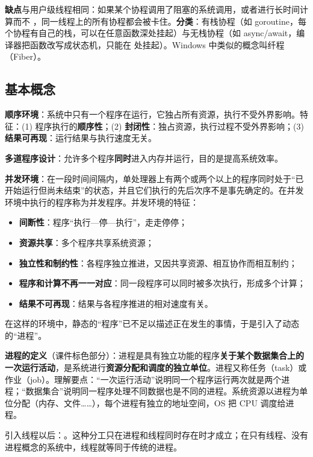 \textbf{缺点}与用户级线程相同：如果某个协程调用了阻塞的系统调用，或者进行长时间计算而不 ，同一线程上的所有协程都会被卡住。\textbf{分类}：有栈协程（如 goroutine，每个协程有自己的栈，可以在任意函数深处挂起）与无栈协程（如 async/await，编译器把函数改写成状态机，只能在  处挂起）。Windows 中类似的概念叫纤程（Fiber）。

\subsection{基本概念}

\textbf{顺序环境}：系统中只有一个程序在运行，它独占所有资源，执行不受外界影响。特征：(1) 程序执行的\textbf{顺序性}；(2) \textbf{封闭性}：独占资源，执行过程不受外界影响；(3) \textbf{结果可再现}：运行结果与执行速度无关。

\textbf{多道程序设计}：允许多个程序\textbf{同时}进入内存并运行，目的是提高系统效率。

\textbf{并发环境}：在一段时间间隔内，单处理器上有两个或两个以上的程序同时处于“已开始运行但尚未结束”的状态，并且它们执行的先后次序不是事先确定的。在并发环境中执行的程序称为并发程序。并发环境的特征：
\begin{itemize}
    \item \textbf{间断性}：程序“执行—停—执行”，走走停停；
    \item \textbf{资源共享}：多个程序共享系统资源；
    \item \textbf{独立性和制约性}：各程序独立推进，又因共享资源、相互协作而相互制约；
    \item \textbf{程序和计算不再一一对应}：同一段程序可以同时被多次执行，形成多个计算；
    \item \textbf{结果不可再现}：结果与各程序推进的相对速度有关。
\end{itemize}
在这样的环境中，静态的“程序”已不足以描述正在发生的事情，于是引入了动态的“进程”。

\textbf{进程的定义}（课件标色部分）：进程是具有独立功能的程序\textbf{关于某个数据集合上的一次运行活动}，是系统进行\textbf{资源分配和调度的独立单位}。进程又称任务（task）或作业（job）。理解要点：“一次运行活动”说明同一个程序运行两次就是两个进程；“数据集合”说明同一程序处理不同数据也是不同的进程。系统资源以进程为单位分配（内存、文件……），每个进程有独立的地址空间，OS 把 CPU 调度给进程。

\ez 引入线程以后：。这种分工只在进程和线程同时存在时才成立；在只有线程、没有进程概念的系统中，线程就等同于传统的进程。

